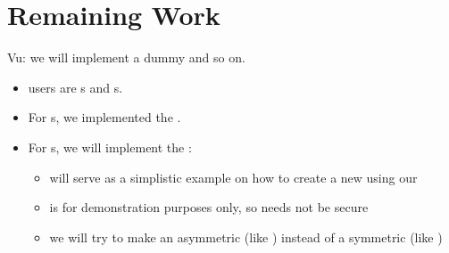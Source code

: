 \section{Remaining Work}


Vu: we will implement a dummy \cs{} and so on.

\begin{itemize}
\item \cry{} users are \eu s and \cg s.
\item For \eu s, we implemented the \rsa{} \cs.
\item For \cg s, we will implement the \dummy{} \cs:
  \begin{itemize}
  \item \dummy{} will serve as a simplistic example
    on how to create a new \cs{} using our \cry{} \cf
  \item \dummy{} is for demonstration purposes only,
    so \dummy{} needs not be secure
  \item we will try to make \dummy{} an asymmetric \cs{}
    (like \rsa) instead of a symmetric \cs{} (like \aes)
  \end{itemize}
\end{itemize}
